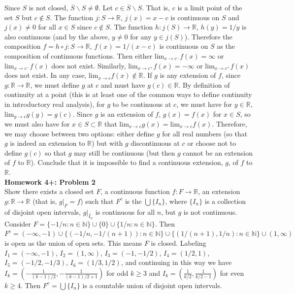 \documentclass[a4paper]{article}
\begin{document}
Since $S$ is not closed, $\overline{S}\backslash S \neq \emptyset$. Let $c \in \overline{S} \backslash S$. That is, $c$ is a limit point of the set $S$ but $c \not\in S$. The function $j:S \rightarrow \mathbb{R}$, $j(x) = x-c$ is continuous on $S$ and $j(x) \neq 0$ for all $x \in S$ since $c \not\in S$. The function $h: j(S) \rightarrow \mathbb{R}$, $h(y) = 1/y$ is also continuous (and by the above, $y \neq 0$ for any $y \in j(S)$). Therefore the composition $f = h\circ j : S \rightarrow \mathbb{R}$, $f(x) =1 /(x-c)$ is continuous on $S$ as the composition of continuous functions. Then either $\text{lim}_{x\rightarrow c^-} f(x) = \infty$ or $\text{lim}_{x\rightarrow c^-} f(x)$ does not exist. Similarly, $\text{lim}_{x\rightarrow c^+} f(x) = -\infty$ or $\text{lim}_{x\rightarrow c^+} f(x)$ does not exist. In any case, $\text{lim}_{x\rightarrow c} f(x) \not\in \mathbb{R}$. If $g$ is any extension of $f$, since $g:\mathbb{R}\rightarrow \mathbb{R}$, we must define $g$ at $c$ and must have $g(c) \in \mathbb{R}$. By definition of continuity at a point (this is at least one of the common ways to define continuity in introductory real analysis), for $g$ to be continuous at $c$, we must have for $y \in \mathbb{R}$, $\text{lim}_{y \rightarrow c} g(y) = g(c)$. Since $g$ is an extension of $f$, $g(x) = f(x)$ for $x \in S$, so we must also have for $x \in S\subset \mathbb{R}$ that $\text{lim}_{x \rightarrow c} g(x) = \text{lim}_{x \rightarrow c} f(x)$. Therefore, we may choose between two options: either define $g$ for all real numbers (so that $g$ is indeed an extension to $\mathbb{R}$) but with $g$ discontinuous at $c$ or choose not to define $g(c)$ so that $g$ may still be continuous (but then $g$ cannot be an extension of $f$ to $\mathbb{R}$). Conclude that it is impossible to find a continuous extension, $g$, of $f$ to $\mathbb{R}$. \\

{\bf Homework 4+: Problem 2}\\

Show there exists a closed set $F$, a continuous function $f:F\rightarrow \mathbb{R}$, an extension $g: \mathbb{R}\rightarrow \mathbb{R}$  (that is, $g\rvert_F = f$) such that $F^c$ is the $\bigcup \{I_n\}$, where $\{I_n\}$ is a collection of disjoint open intervals, $g\rvert_{\overline{I_n}}$  is continuous for all $n$, but $g$ is not continuous.\\

Consider $F = \{-1/n : n \in \mathbb{N}\}\cup \{0\} \cup \{1/n : n \in \mathbb{N}\}$. Then $F^c = (-\infty, -1)\cup \{(-1/n, -1/(n+1)) : n \in \mathbb{N}\} \cup \{(1/(n+1), 1/n) : n \in \mathbb{N}\}\cup (1,\infty)$ is open as the union of open sets. This means $F$ is closed. Labeling $I_1 = (-\infty,-1)$, $I_2 = (1,\infty)$, $I_3 = (-1,-1/2)$, $I_4 = (1/2,1)$, $I_5 = (-1/2,-1/3)$, $I_6 = (1/3,1/2)$, and continuing in this way we have $I_k = \left(-\frac{1}{(k-1)/2}, -\frac{1}{(k-1)/2 + 1}\right)$ for odd $k \geq 3$ and $I_k = \left(\frac{1}{k/2}, \frac{1}{k/2 - 1}\right)$ for even $k \geq 4$. Then $F^c = \bigcup \{I_n\}$ is a countable union of disjoint open intervals. \\
\end{document}
